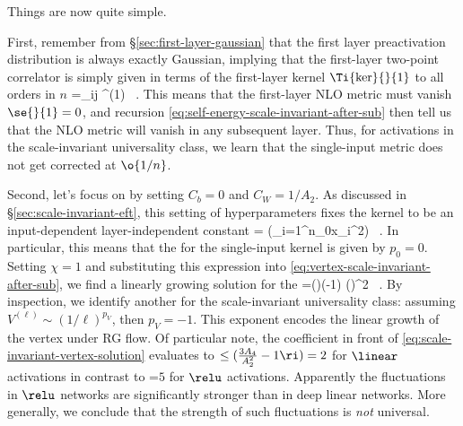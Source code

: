 Things are now quite simple. 
\bi
\item First, remember from \S\ref{sec:first-layer-gaussian} that the first layer preactivation distribution is always exactly Gaussian, implying that the first-layer two-point correlator
is simply given in terms of the first-layer kernel $\Ti{\ker}{}{1}$ to all orders in $n$
\be\label{eq:two-point-first-layer-reprinted}
=\delta_{ij} \ker^{(1)} \, .
\ee
This means that the first-layer NLO metric must vanish $\se{}{1}=0$, and recursion \eqref{eq:self-energy-scale-invariant-after-sub} then tell us that the NLO metric will vanish in any subsequent layer. Thus, for activations in the scale-invariant universality class, we learn that the single-input metric does not get corrected at $\o{1/n}$. 
\item Second, let's focus on  by setting $C_b=0$ and $C_W = 1/A_2$. As discussed in \S\ref{sec:scale-invariant-eft}, this setting of hyperparameters fixes the kernel to be an input-dependent layer-independent constant 
\be
\Ti{\ker}{}{\ell}=\Tif{\ker}{}\equiv{} \le(\sum_{i=1}^{n_0}x_i^2\ri) \, .
\ee
In particular, this means that the  for the single-input kernel is given by $p_0=0$. Setting $\chi=1$ and substituting this expression into \eqref{eq:vertex-scale-invariant-after-sub}, we find a linearly growing  solution for the 
\be\label{eq:scale-invariant-vertex-solution}
\Ti{\FPV}{}{\ell}=\le(\ri)\le(-1\ri) \le(\Tif{\ker}{}\ri)^2 \, .
\ee
By inspection, we identify another  for the scale-invariant universality class: assuming $V^{(\ell)}\sim (1/\ell)^{p_V}$, then $p_V=-1$. This exponent encodes the linear growth of the vertex under RG flow.
Of particular note, the coefficient in front of \eqref{eq:scale-invariant-vertex-solution} evaluates to $\le(\frac{3 A_4}{A_2^2} -1\ri)= 2$ for $\linear$ activations in contrast to =$5$ for $\relu$ activations. Apparently the fluctuations in $\relu$ networks are significantly stronger than in deep linear networks. More generally, we conclude that the strength of such fluctuations is \emph{not} universal.  



